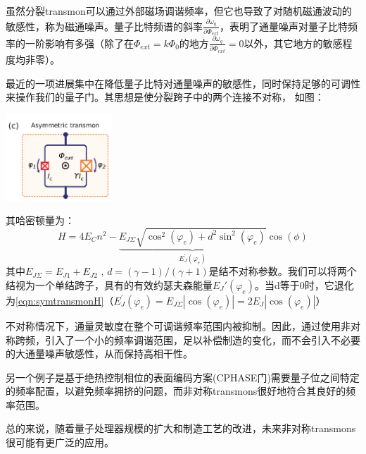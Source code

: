 \documentclass[12pt, a4paper, oneside]{ctexbook}
\newcounter{#2}
\newcounter{#2}[#1]
\numberwithin{#2}{#1}
\newcommand{\pian}[2]{\frac{\partial #1}{\partial #2}}
\begin{document}
            \begin{theorem}
              虽然分裂transmon可以通过外部磁场调谐频率，但它也导致了对随机磁通波动的敏感性，称为磁通噪声。量子比特频谱的斜率\(\pian{\omega_q}{\Phi_{ext}}\)，表明了通量噪声对量子比特频率的一阶影响有多强（除了在\(\Phi_{ext}=k\Phi_0\)的地方\(\pian{\omega_q}{\Phi_{ext}}=0\)以外，其它地方的敏感程度均非零）。

              最近的一项进展集中在降低量子比特对通量噪声的敏感性，同时保持足够的可调性来操作我们的量子门。其思想是使分裂跨子中的两个连接不对称，
              如图：

              \begin{center}
              \includegraphics[width=0.3\textwidth]{scr/不对称transmon.png}
              \end{center}
              
              其哈密顿量为：
              \begin{equation}
                H=4 E_C n^2-\underbrace{E_{J \Sigma} \sqrt{\cos ^2\left(\varphi_e\right)+d^2 \sin ^2\left(\varphi_e\right)}}_{E_J^{\prime}\left(\varphi_e\right)} \cos (\phi)
              \end{equation}
              其中\(E_{J \Sigma}=E_{J 1}+E_{J 2} \text { , } d=(\gamma-1) /(\gamma+1)\)是结不对称参数。我们可以将两个结视为一个单结跨子，具有的有效约瑟夫森能量\(E_J'(\varphi_e)\)。当d等于0时，它退化为\autoref{eqn:symtransmonH}（\(E_J^{\prime}\left(\varphi_e\right)=E_{J \Sigma}\left|\cos \left(\varphi_e\right)\right|=2E_{J}\left|\cos \left(\varphi_e\right)\right|\)）


              
            \end{theorem}

            \begin{theorem}
              不对称情况下，通量灵敏度在整个可调谐频率范围内被抑制。因此，通过使用非对称跨频，引入了一个小的频率调谐范围，足以补偿制造的变化，而不会引入不必要的大通量噪声敏感性，从而保持高相干性。
              
              另一个例子是基于绝热控制相位的表面编码方案(CPHASE门)需要量子位之间特定的频率配置，以避免频率拥挤的问题，而非对称transmons很好地符合其良好的频率范围。

              总的来说，随着量子处理器规模的扩大和制造工艺的改进，未来非对称transmons很可能有更广泛的应用。
            \end{theorem}
\end{document}
